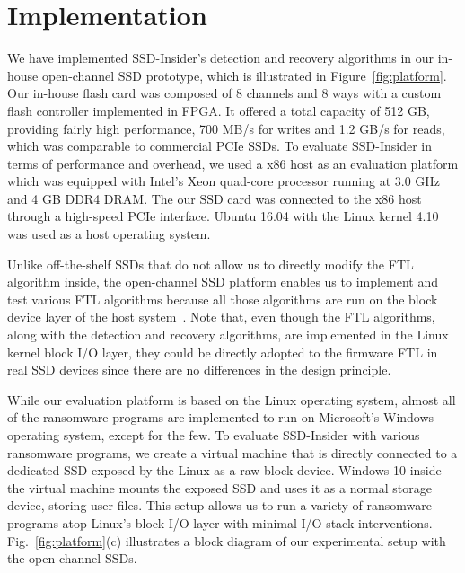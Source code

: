 \documentclass[conference]{IEEEtran}
\newcommand{\ours}{SSD-Insider}
\begin{document}
\section{Implementation}
We have implemented \ours{}'s detection and recovery algorithms in
our in-house open-channel SSD prototype, which is illustrated in
Figure~\ref{fig:platform}.  Our in-house flash card was composed of
8 channels and 8 ways with a custom flash controller implemented in
FPGA.  It offered a total capacity of 512 GB, providing fairly high
performance, 700 MB/s for writes and 1.2 GB/s for reads, which was
comparable to commercial PCIe SSDs.  To evaluate \ours{} in terms
of performance and overhead, we used a x86 host as an evaluation
platform which was equipped with Intel's Xeon quad-core processor
running at 3.0 GHz and 4 GB DDR4 DRAM.  The our SSD card was
connected to the x86 host through a high-speed PCIe interface.
Ubuntu 16.04 with the Linux kernel 4.10 was used as a host
operating system.  

Unlike off-the-shelf SSDs that do not allow us to directly modify
the FTL algorithm inside, the open-channel SSD platform enables us
to implement and test various FTL algorithms because all those
algorithms are run on the block device layer of the host
system~\cite{lightnvm}.  Note that, even though the FTL algorithms,
along with the detection and recovery algorithms, are implemented
in the Linux kernel block I/O layer, they could be directly adopted
to the firmware FTL in real SSD devices since there are no
differences in the design principle.

While our evaluation platform is based on the Linux operating
system, almost all of the ransomware programs are implemented to
run on Microsoft's Windows operating system, except for the few.
To evaluate \ours{} with various ransomware programs, we create a
virtual machine that is directly connected to a dedicated SSD
exposed by the Linux as a raw block device.  Windows 10 inside the
virtual machine mounts the exposed SSD and uses it as a normal
storage device, storing user files. This setup allows us to run a
variety of ransomware programs atop Linux's block I/O layer with
minimal I/O stack interventions. Fig.~\ref{fig:platform}(c)
illustrates a block diagram of our experimental setup with the
open-channel SSDs.


\end{document}
